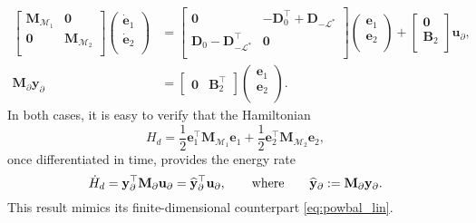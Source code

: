 \begin{equation}\label{eq:pHlinsys_findim_J2}
\begin{aligned}
\begin{bmatrix}
\mathbf{M}_{\mathcal{M}_1} & \mathbf{0} \\
\mathbf{0} & \mathbf{M}_{\mathcal{M}_2} \\
\end{bmatrix}
\begin{pmatrix}
\dot{\mathbf{e}}_{1} \\
\dot{\mathbf{e}}_{2} \\
\end{pmatrix}
&= \begin{bmatrix}
\mathbf{0} & -\mathbf{D}_{0}^\top + \mathbf{D}_{-\mathcal{L}^*} \\
\mathbf{D}_{0} - \mathbf{D}_{-\mathcal{L}^*}^\top & \mathbf{0} \\
\end{bmatrix} 
\begin{pmatrix}
\mathbf{e}_{1} \\
\mathbf{e}_{2} \\
\end{pmatrix} + 
\begin{bmatrix}
\mathbf{0}\\
\mathbf{B}_2\\
\end{bmatrix}
\mathbf{u}_\partial, \\
\mathbf{M}_\partial {\mathbf{y}_\partial} &= 
\begin{bmatrix}
\mathbf{0} & \mathbf{B}_2^\top 
\end{bmatrix}\begin{pmatrix}
\mathbf{e}_{1} \\
\mathbf{e}_{2} \\
\end{pmatrix}.
\end{aligned}
\end{equation}
In both cases, it is easy to verify that the Hamiltonian
\begin{equation}
H_d = \frac{1}{2} {\mathbf{e}}_1^\top \mathbf{M}_{\mathcal{M}_1} {\mathbf{e}}_1 + \frac{1}{2} {\mathbf{e}}_2^\top \mathbf{M}_{\mathcal{M}_2} {\mathbf{e}}_2,
\end{equation}
once differentiated in time, provides the energy rate
\begin{equation}
\dot{H}_d = \mathbf{y}_\partial^\top \mathbf{M}_\partial \mathbf{u}_\partial = \widehat{\mathbf{y}}_\partial^\top \mathbf{u}_\partial, \qquad \text{where} \qquad \widehat{\mathbf{y}}_\partial:=\mathbf{M}_\partial \mathbf{y}_\partial.
\end{equation}
This result mimics its finite-dimensional counterpart \eqref{eq:powbal_lin}.
